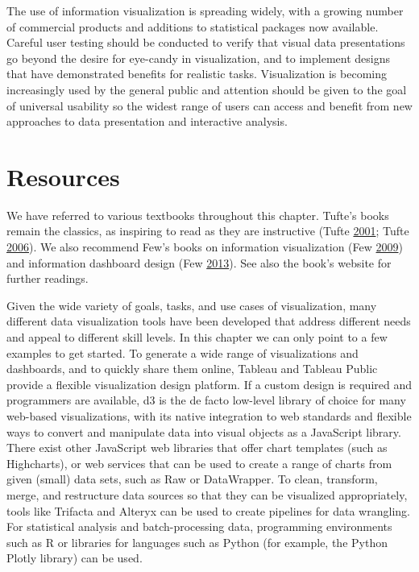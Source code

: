 \documentclass[]{krantz}
\begin{document}
The use of information visualization is spreading widely, with a growing
number of commercial products and additions to statistical packages now
available. Careful user testing should be conducted to verify that
visual data presentations go beyond the desire for eye-candy in
visualization, and to implement designs that have demonstrated benefits
for realistic tasks. Visualization is becoming increasingly used by the
general public and attention should be given to the goal of universal
usability so the widest range of users can access and benefit from new
approaches to data presentation and interactive analysis.

\hypertarget{sec:mylabel4}{\section{Resources}\label{sec:mylabel4}}

We have referred to various textbooks throughout this chapter. Tufte's
books remain the classics, as inspiring to read as they are instructive
(Tufte \protect\hyperlink{ref-edward2001visual}{2001}; Tufte
\protect\hyperlink{ref-edward2006beauty}{2006}). We also recommend Few's
books on information visualization (Few
\protect\hyperlink{ref-few2009now}{2009}) and information dashboard
design (Few \protect\hyperlink{ref-few2013information}{2013}). See also
the book's website for further readings.

Given the wide variety of goals, tasks, and use cases of visualization,
many different data visualization tools have been developed that address
different needs and appeal to different skill levels. In this chapter we
can only point to a few examples to get started. To generate a wide
range of visualizations and dashboards, and to quickly share them
online, Tableau and Tableau Public provide a flexible visualization
design platform. If a custom design is required and programmers are
available, d3 is the de facto low-level library of choice for many
web-based visualizations, with its native integration to web standards
and flexible ways to convert and manipulate data into visual objects as
a JavaScript library. There exist other JavaScript web libraries that
offer chart templates (such as Highcharts), or web services that can be
used to create a range of charts from given (small) data sets, such as
Raw or DataWrapper. To clean, transform, merge, and restructure data
sources so that they can be visualized appropriately, tools like
Trifacta and Alteryx can be used to create pipelines for data wrangling.
For statistical analysis and batch-processing data, programming
environments such as R or libraries for languages such as Python (for
example, the Python Plotly library) can be used.
\end{document}
